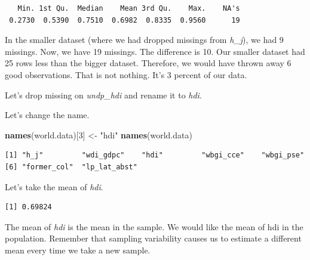 \documentclass[]{article}
\newenvironment{Shaded}{\begin{snugshade}}{\end{snugshade}}
\newcommand{\KeywordTok}[1]{\textcolor[rgb]{0.13,0.29,0.53}{\textbf{#1}}}
\newcommand{\DecValTok}[1]{\textcolor[rgb]{0.00,0.00,0.81}{#1}}
\newcommand{\StringTok}[1]{\textcolor[rgb]{0.31,0.60,0.02}{#1}}
\newcommand{\OperatorTok}[1]{\textcolor[rgb]{0.81,0.36,0.00}{\textbf{#1}}}
\newcommand{\NormalTok}[1]{#1}
\theoremstyle{definition}
\theoremstyle{definition}
\theoremstyle{definition}
\theoremstyle{remark}
\begin{document}
\begin{verbatim}
   Min. 1st Qu.  Median    Mean 3rd Qu.    Max.    NA's 
 0.2730  0.5390  0.7510  0.6982  0.8335  0.9560      19 
\end{verbatim}

In the smaller dataset (where we had dropped missings from \emph{h\_j}),
we had 9 missings. Now, we have 19 missings. The difference is 10. Our
smaller dataset had 25 rows less than the bigger dataset. Therefore, we
would have thrown away 6 good observations. That is not nothing. It's 3
percent of our data.

Let's drop missing on \emph{undp\_hdi} and rename it to \emph{hdi}.

\begin{Shaded}
\end{Shaded}

Let's change the name.

\begin{Shaded}
\begin{Highlighting}[]
\KeywordTok{names}\NormalTok{(world.data)[}\DecValTok{3}\NormalTok{] <-}\StringTok{ "hdi"}
\KeywordTok{names}\NormalTok{(world.data)}
\end{Highlighting}
\end{Shaded}

\begin{verbatim}
[1] "h_j"         "wdi_gdpc"    "hdi"         "wbgi_cce"    "wbgi_pse"   
[6] "former_col"  "lp_lat_abst"
\end{verbatim}

Let's take the mean of \emph{hdi}.

\begin{Shaded}
\end{Shaded}

\begin{verbatim}
[1] 0.69824
\end{verbatim}

The mean of \emph{hdi} is the mean in the sample. We would like the mean
of hdi in the population. Remember that sampling variability causes us
to estimate a different mean every time we take a new sample.
\end{document}
